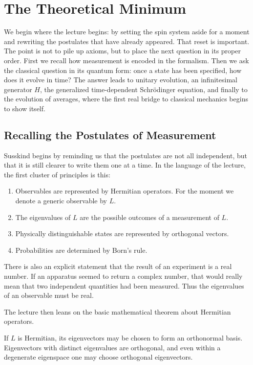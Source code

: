 \chapter{The Theoretical Minimum}

We begin where the lecture begins: by setting the spin system aside for a moment and rewriting the postulates that have already appeared. That reset is important. The point is not to pile up axioms, but to place the next question in its proper order. First we recall how measurement is encoded in the formalism. Then we ask the classical question in its quantum form: once a state has been specified, how does it evolve in time? The answer leads to unitary evolution, an infinitesimal generator \(H\), the generalized time-dependent Schr\"odinger equation, and finally to the evolution of averages, where the first real bridge to classical mechanics begins to show itself.

\section{Recalling the Postulates of Measurement}

Susskind begins by reminding us that the postulates are not all independent, but that it is still clearer to write them one at a time. In the language of the lecture, the first cluster of principles is this:
\begin{enumerate}
\item Observables are represented by Hermitian operators. For the moment we denote a generic observable by \(L\).
\item The eigenvalues of \(L\) are the possible outcomes of a measurement of \(L\).
\item Physically distinguishable states are represented by orthogonal vectors.
\item Probabilities are determined by Born's rule.
\end{enumerate}

There is also an explicit statement that the result of an experiment is a real number. If an apparatus seemed to return a complex number, that would really mean that two independent quantities had been measured. Thus the eigenvalues of an observable must be real.

The lecture then leans on the basic mathematical theorem about Hermitian operators.

\begin{theorem}
If \(L\) is Hermitian, its eigenvectors may be chosen to form an orthonormal basis. Eigenvectors with distinct eigenvalues are orthogonal, and even within a degenerate eigenspace one may choose orthogonal eigenvectors.
\end{theorem}


